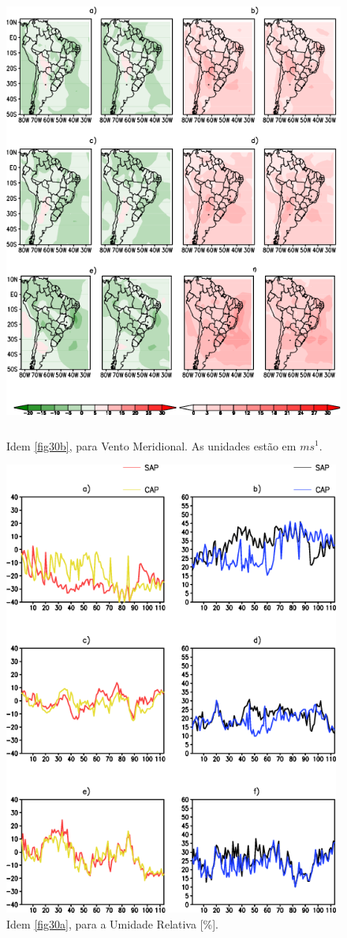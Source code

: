 \begin{figure}[!h]
\centering
\includegraphics[height=15cm]{./figs/campo_vies_eqm-vvel.png}
\caption{Idem \autoref{fig30b}, para Vento Meridional. As unidades estão em $ms^{1}$.}
\label{fig33b}
\end{figure}

\break

\begin{figure}[!h]
\centering
\includegraphics[height=15cm]{./figs/vies_eqm-umrl.png}
\caption{Idem \autoref{fig30a}, para a Umidade Relativa [\%].}
\label{fig34a}
\end{figure}


